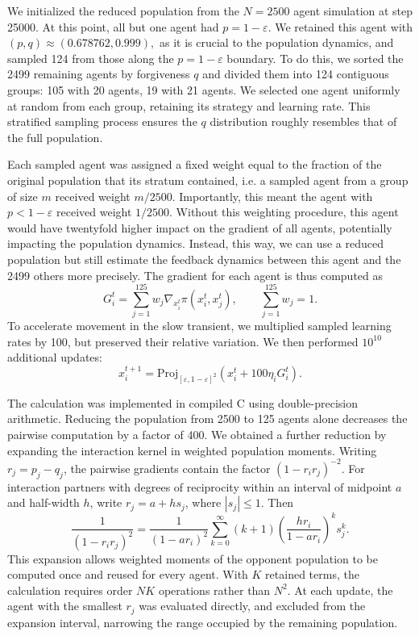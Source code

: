 \documentclass[10pt]{article}
\newcommand{\eps}{\varepsilon}
\begin{document}
We initialized the reduced population from the $N = 2500$ agent simulation at step 25000. At this point, all but one agent had $p = 1-\eps$. We retained this agent with $(p, q) \approx (0.678762, 0.999),$ as it is crucial to the population dynamics, and sampled 124 from those along the $p = 1-\eps$ boundary. To do this, we sorted the 2499 remaining agents by forgiveness $q$ and divided them into 124 contiguous groups: 105 with 20 agents, 19 with 21 agents. We selected one agent uniformly at random from each group, retaining its strategy and learning rate. This stratified sampling process ensures the $q$ distribution roughly resembles that of the full population.

Each sampled agent was assigned a fixed weight equal to the fraction of the original population that its stratum contained, i.e. a sampled agent from a group of size $m$ received weight $m/2500$. Importantly, this meant the agent with $p < 1-\eps$ received weight $1/2500.$ Without this weighting procedure, this agent would have twentyfold higher impact on the gradient of all agents, potentially impacting the population dynamics. Instead, this way, we can use a reduced population but still estimate the feedback dynamics between this agent and the 2499 others more precisely. The gradient for each agent is thus computed as
\[
G_i^t = \sum_{j=1}^{125} w_j \nabla_{x_i^t} \pi(x_i^t, x_j^t), \qquad \sum_{j=1}^{125}w_j = 1.
\]
To accelerate movement in the slow transient, we multiplied sampled learning rates by 100, but preserved their relative variation. We then performed $10^{10}$ additional updates:
\[
    x_i^{t+1} = \mathrm{Proj}_{[\eps, 1-\eps]^2} (x_i^t + 100\eta_i G_i^t).
\]

The calculation was implemented in compiled C using double-precision arithmetic. Reducing the population from 2500 to 125 agents alone decreases the pairwise computation by a factor of 400. We obtained a further reduction by expanding the interaction kernel in weighted population moments. Writing $r_j = p_j - q_j$, the pairwise gradients contain the factor $(1-r_ir_j)^{-2}$. For interaction partners with degrees of reciprocity within an interval of midpoint $a$ and half-width $h$, write $r_j = a+ hs_j$, where $|s_j|\leq 1$. Then
\[
    \frac{1}{(1-r_ir_j)^2} = \frac{1}{(1-ar_i)^2} \sum_{k=0}^{\infty} (k+1) \left(\frac{hr_i}{1-ar_i}\right)^k s_j^k.
\]
This expansion allows weighted moments of the opponent population to be computed once and reused for every agent. With $K$ retained terms, the calculation requires order $NK$ operations rather than $N^2$. At each update, the agent with the smallest $r_j$ was evaluated directly, and excluded from the expansion interval, narrowing the range occupied by the remaining population.
\end{document}
